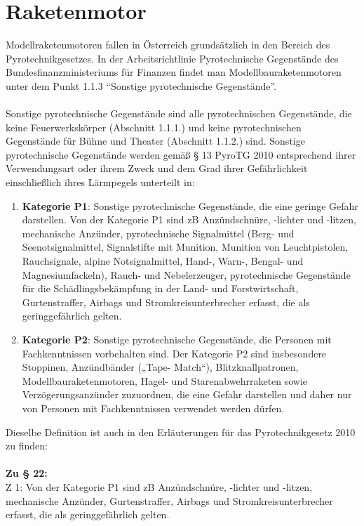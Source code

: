 \section{Raketenmotor}
\label{sec:rocket_motor_legal}
Modellraketenmotoren fallen in Österreich grundsätzlich in den Bereich des Pyrotechnikgesetzes. In der Arbeitsrichtlinie Pyrotechnische Gegenstände des Bundesfinanzministeriums für Finanzen findet man Modellbauraketenmotoren unter dem Punkt 1.1.3 "`Sonstige pyrotechnische Gegenstände"'.
\\
\\
Sonstige pyrotechnische Gegenstände sind alle pyrotechnischen Gegenstände, die keine Feuerwerkskörper (Abschnitt 1.1.1.) und keine pyrotechnischen Gegenstände für Bühne und Theater (Abschnitt 1.1.2.) sind. Sonstige pyrotechnische Gegenstände werden gemäß § 13 PyroTG 2010 entsprechend ihrer Verwendungsart oder ihrem Zweck und dem Grad ihrer
Gefährlichkeit einschließlich ihres Lärmpegels unterteilt in:
\begin{enumerate}
    \item \textbf{Kategorie P1}: Sonstige pyrotechnische Gegenstände, die eine geringe Gefahr darstellen. Von der Kategorie P1 sind zB Anzündschnüre, -lichter und -litzen, mechanische Anzünder, pyrotechnische Signalmittel (Berg- und Seenotsignalmittel, Signalstifte mit Munition, Munition von Leuchtpistolen, Rauchsignale, alpine Notsignalmittel, Hand-, Warn-, Bengal- und Magnesiumfackeln), Rauch- und Nebelerzeuger, pyrotechnische Gegenstände für die Schädlingsbekämpfung in der Land- und Forstwirtschaft, Gurtenstraffer, Airbags und Stromkreisunterbrecher erfasst, die als geringgefährlich gelten.
    \item \textbf{Kategorie P2}: Sonstige pyrotechnische Gegenstände, die Personen mit Fachkenntnissen vorbehalten sind. Der Kategorie P2 sind insbesondere Stoppinen, Anzündbänder („Tape- Match“), Blitzknallpatronen, Modellbauraketenmotoren, Hagel- und Starenabwehrraketen sowie Verzögerungsanzünder zuzuordnen, die eine Gefahr darstellen und daher nur von Personen mit Fachkenntnissen verwendet werden dürfen. \parencite{BMF_Pyro}
\end{enumerate} 
\vspace{0.5cm}
Dieselbe Definition ist auch in den Erläuterungen für das Pyrotechnikgesetz 2010 zu finden:
\\
\\
\textbf{Zu § 22:} \\
Z 1: Von der Kategorie P1 sind zB Anzündschnüre, -lichter und -litzen, mechanische Anzünder, Gurtenstraffer, Airbags und Stromkreisunterbrecher erfasst, die als geringgefährlich gelten. \\
